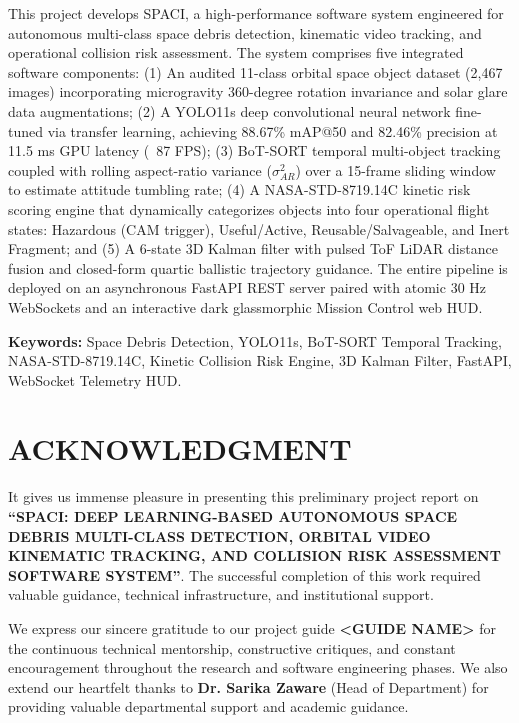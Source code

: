 \documentclass[12pt]{report}
\begin{document}
This project develops SPACI, a high-performance software system engineered for autonomous multi-class space debris detection, kinematic video tracking, and operational collision risk assessment. The system comprises five integrated software components: (1) An audited 11-class orbital space object dataset (2,467 images) incorporating microgravity 360-degree rotation invariance and solar glare data augmentations; (2) A YOLO11s deep convolutional neural network fine-tuned via transfer learning, achieving 88.67\% mAP@50 and 82.46\% precision at 11.5 ms GPU latency (~87 FPS); (3) BoT-SORT temporal multi-object tracking coupled with rolling aspect-ratio variance ($\sigma^2_{AR}$) over a 15-frame sliding window to estimate attitude tumbling rate; (4) A NASA-STD-8719.14C kinetic risk scoring engine that dynamically categorizes objects into four operational flight states: Hazardous (CAM trigger), Useful/Active, Reusable/Salvageable, and Inert Fragment; and (5) A 6-state 3D Kalman filter with pulsed ToF LiDAR distance fusion and closed-form quartic ballistic trajectory guidance. The entire pipeline is deployed on an asynchronous FastAPI REST server paired with atomic 30 Hz WebSockets and an interactive dark glassmorphic Mission Control web HUD.

\vspace{0.2in}
\noindent \textbf{Keywords:} Space Debris Detection, YOLO11s, BoT-SORT Temporal Tracking, NASA-STD-8719.14C, Kinetic Collision Risk Engine, 3D Kalman Filter, FastAPI, WebSocket Telemetry HUD.

\newpage

\chapter*{ACKNOWLEDGMENT}
It gives us immense pleasure in presenting this preliminary project report on \textbf{``SPACI: DEEP LEARNING-BASED AUTONOMOUS SPACE DEBRIS MULTI-CLASS DETECTION, ORBITAL VIDEO KINEMATIC TRACKING, AND COLLISION RISK ASSESSMENT SOFTWARE SYSTEM''}. The successful completion of this work required valuable guidance, technical infrastructure, and institutional support.

We express our sincere gratitude to our project guide \textbf{<GUIDE NAME>} for the continuous technical mentorship, constructive critiques, and constant encouragement throughout the research and software engineering phases. We also extend our heartfelt thanks to \textbf{Dr. Sarika Zaware} (Head of Department) for providing valuable departmental support and academic guidance.
\end{document}
